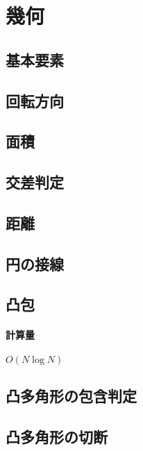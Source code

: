 \documentclass[landscape,twocolumn,9pt]{jsarticle}
\begin{document}
\section{幾何}%
\subsection{基本要素}


\subsection{回転方向}


\subsection{面積}


\subsection{交差判定}


\subsection{距離}


\subsection{円の接線}


\subsection{凸包}
\paragraph{計算量} $O(N\log N)$


\subsection{凸多角形の包含判定}


\subsection{凸多角形の切断}

\end{document}

